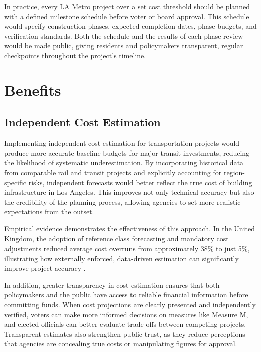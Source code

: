 \documentclass[12pt]{article}
\begin{document}
        In practice, every LA Metro project over a set cost threshold should be planned with a defined milestone schedule before voter or board approval. This schedule would specify construction phases, expected completion dates, phase budgets, and verification standards. Both the schedule and the results of each phase review would be made public, giving residents and policymakers transparent, regular checkpoints throughout the project's timeline.

    \newpage
    \section{Benefits}

        \subsection{Independent Cost Estimation}

        Implementing independent cost estimation for transportation projects would produce more accurate baseline budgets for major transit investments, reducing the likelihood of systematic underestimation. By incorporating historical data from comparable rail and transit projects and explicitly accounting for region-specific risks, independent forecasts would better reflect the true cost of building infrastructure in Los Angeles. This improves not only technical accuracy but also the credibility of the planning process, allowing agencies to set more realistic expectations from the outset.

        Empirical evidence demonstrates the effectiveness of this approach. In the United Kingdom, the adoption of reference class forecasting and mandatory cost adjustments reduced average cost overruns from approximately 38\% to just 5\%, illustrating how externally enforced, data-driven estimation can significantly improve project accuracy \cite{j8}.

        In addition, greater transparency in cost estimation ensures that both policymakers and the public have access to reliable financial information before committing funds. When cost projections are clearly presented and independently verified, voters can make more informed decisions on measures like Measure M, and elected officials can better evaluate trade-offs between competing projects. Transparent estimates also strengthen public trust, as they reduce perceptions that agencies are concealing true costs or manipulating figures for approval.
\end{document}
